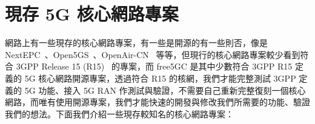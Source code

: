 \section{現存 5G 核心網路專案}
\label{sec:5g_core_project}

網路上有一些現存的核心網路專案，有一些是開源的有一些則否，像是 NextEPC~\cite{nextepc}、Open5GS~\cite{open5gs}、OpenAir-CN~\cite{oai-cn} 等等，但現行的核心網路專案較少看到符合 3GPP Release 15 (R15)~\cite{3gpp.r15} 的專案，而 free5GC 是其中少數符合 3GPP R15 定義的 5G 核心網路開源專案，透過符合 R15 的核網，我們才能完整測試 3GPP 定義的 5G 功能、接入 5G RAN 作測試與驗證，不需要自己重新完整復刻一個核心網路，而唯有使用開源專案，我們才能快速的開發與修改我們所需要的功能、驗證我們的想法。下面我們介紹一些現存較知名的核心網路專案：

